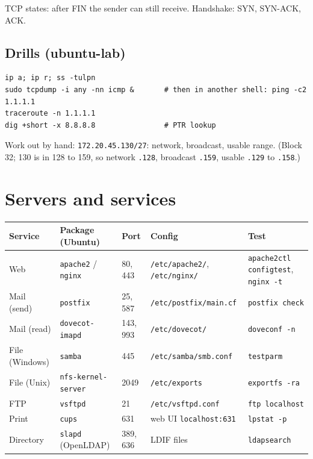 \documentclass[11pt,a4paper]{article}
\begin{document}
TCP states: after FIN the sender can still receive. Handshake: SYN, SYN-ACK, ACK.

\subsection*{Drills (ubuntu-lab)}
\begin{lstlisting}
ip a; ip r; ss -tulpn
sudo tcpdump -i any -nn icmp &       # then in another shell: ping -c2 1.1.1.1
traceroute -n 1.1.1.1
dig +short -x 8.8.8.8                # PTR lookup
\end{lstlisting}
Work out by hand: \texttt{172.20.45.130/27}: network, broadcast, usable range. (Block 32; 130 is in 128 to 159, so network \texttt{.128}, broadcast \texttt{.159}, usable \texttt{.129} to \texttt{.158}.)

\clearpage
\section{Servers and services}
\begin{center}\small\renewcommand{\arraystretch}{1.18}\setlength{\tabcolsep}{9pt}
\begin{tabularx}{\linewidth}{@{}l>{\raggedright\arraybackslash}Xl>{\raggedright\arraybackslash}X>{\raggedright\arraybackslash}X@{}}
\toprule
\textbf{\color{slate}Service} & \textbf{\color{slate}Package (Ubuntu)} & \textbf{\color{slate}Port} & \textbf{\color{slate}Config} & \textbf{\color{slate}Test} \\ \midrule
Web & \texttt{apache2} / \texttt{nginx} & 80, 443 & \texttt{/etc/apache2/}, \texttt{/etc/nginx/} & \texttt{apache2ctl configtest}, \texttt{nginx -t} \\
Mail (send) & \texttt{postfix} & 25, 587 & \texttt{/etc/postfix/main.cf} & \texttt{postfix check} \\
Mail (read) & \texttt{dovecot-imapd} & 143, 993 & \texttt{/etc/dovecot/} & \texttt{doveconf -n} \\
File (Windows) & \texttt{samba} & 445 & \texttt{/etc/samba/smb.conf} & \texttt{testparm} \\
File (Unix) & \texttt{nfs-kernel-server} & 2049 & \texttt{/etc/exports} & \texttt{exportfs -ra} \\
FTP & \texttt{vsftpd} & 21 & \texttt{/etc/vsftpd.conf} & \texttt{ftp localhost} \\
Print & \texttt{cups} & 631 & web UI \texttt{localhost:631} & \texttt{lpstat -p} \\
Directory & \texttt{slapd} (OpenLDAP) & 389, 636 & LDIF files & \texttt{ldapsearch} \\
\bottomrule
\end{tabularx}\end{center}
\end{document}
